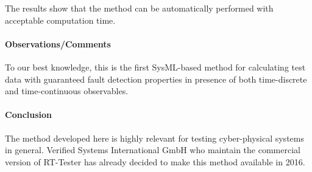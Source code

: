 The results show that the method can be automatically performed with acceptable 
computation time. 

\paragraph{Observations/Comments}

To our best knowledge, this is the first SysML-based method
for calculating test data with guaranteed fault detection properties in presence of
both time-discrete and time-continuous observables.


\paragraph{Conclusion}

The method developed here is highly relevant for testing cyber-physical systems
in general. Verified Systems International GmbH who maintain the commercial version
of RT-Tester has already decided to make this method available in 2016.